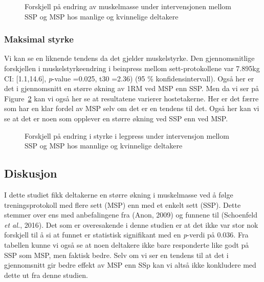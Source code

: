 \documentclass[
  letterpaper,
  DIV=11,
  numbers=noendperiod]{scrreprt}
\begin{document}
\begin{figure}


\caption{\label{fig-lean-body-mass}Forskjell på endring av muskelmasse
under intervensjonen mellom SSP og MSP hos manlige og kvinnelige
deltakere}

\end{figure}%

\subsubsection{Maksimal styrke}\label{maksimal-styrke}

Vi kan se en liknende tendens da det gjelder muskelstyrke. Den
gjennomsnitlige forskjellen i muskelstyrkeendring i beinpress mellom
sett-protokollene var 7.895kg CI: {[}1.1,14.6{]}, \emph{p}-value =0.025,
t30 =2.36) (95 \% konfidensintervall). Også her er det i gjennomsnitt en
større økning av 1RM ved MSP enn SSP. Men da vi ser på
Figure~\ref{fig-strength-test} kan vi også her se at resultatene
varierer hostetakerne. Her er det færre som har en klar fordel av MSP
selv om det er en tendens til det. Også her kan vi se at det er noen som
opplever en større økning ved SSP enn ved MSP.

\begin{figure}


\caption{\label{fig-strength-test}Forskjell på endring i styrke i
legpress under intervensjon mellom SSP og MSP hos mannlige og kvinnelige
deltakere}

\end{figure}%

\subsection{Diskusjon}\label{diskusjon-2}

I dette studiet fikk deltakerne en større økning i muskelmasse ved å
følge treningsprotokoll med flere sett (MSP) enn med et enkelt sett
(SSP). Dette stemmer over ens med anbefalingene fra (Anon, 2009) og
funnene til (Schoenfeld \emph{et al.}, 2016). Det som er overesakende i
denne studien er at det ikke var stor nok forskjell til å si at funnet
er statistisk signifikant med en \emph{p}-verdi på 0.036. Fra tabellen
kunne vi også se at noen deltakere ikke bare responderte like godt på
SSP som MSP, men faktisk bedre. Selv om vi ser en tendens til at det i
gjennomsnitt gir bedre effekt av MSP enn SSp kan vi altså ikke
konkludere med dette ut fra denne studien.
\end{document}
